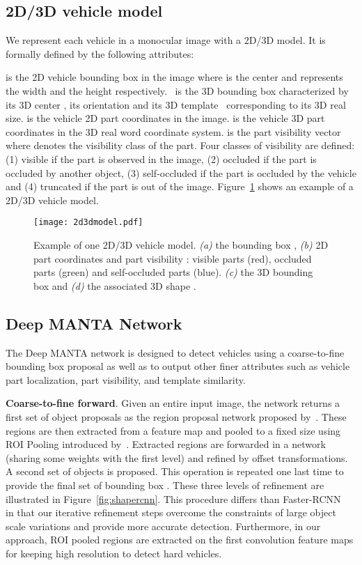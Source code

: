 \documentclass[10pt,twocolumn,letterpaper]{article}
\begin{document}
\subsection{2D/3D vehicle model}
\label{Vehicle shape model}

We represent each vehicle in a monocular image with a 2D/3D model. It is formally defined by the following attributes:

 is the 2D vehicle bounding box in the image where  is the center and  represents the width and the height respectively.~ is the 3D bounding box characterized by its 3D center , its orientation  and its 3D template~ corresponding to its 3D real size.  is the vehicle 2D part coordinates in the image.  is the vehicle 3D part coordinates in the 3D real word coordinate system.  is the part visibility vector where  denotes the visibility class of the  part. Four classes of visibility are defined: (1) visible if the part is observed in the image, (2) occluded if the part is occluded by another object, (3) self-occluded if the part is occluded by the vehicle and (4) truncated if the part is out of the image. Figure~\ref{fig:vis} shows an example of a 2D/3D vehicle model.  

\begin{figure}[ht]
\texttt{[image: 2d3dmodel.pdf]}
\centering
\vspace{-1mm}
\caption{Example of one 2D/3D vehicle model. \textit{(a)} the bounding box , \textit{(b)} 2D part coordinates  and part visibility : visible parts (red), occluded parts (green) and self-occluded parts (blue). \textit{(c)} the 3D bounding box  and \textit{(d)} the associated 3D shape .}
\label{fig:vis}
\end{figure}

\subsection{Deep MANTA Network}
\label{Deep MANTA network}

The Deep MANTA network is designed to detect vehicles using a coarse-to-fine bounding box proposal as well as to output other finer attributes such as vehicle part localization, part visibility, and template similarity.

\textbf{Coarse-to-fine forward}. Given an entire input image, the network returns a first set of  object proposals  as the region proposal network proposed by~\cite{faster}. These regions are then extracted from a feature map and pooled to a fixed size using ROI Pooling introduced by~\cite{fast}. Extracted regions are forwarded in a network (sharing some weights with the first level) and refined by offset transformations. A second set of  objects  is proposed. This operation is repeated one last time to provide the final set of bounding box . These three levels of refinement are illustrated in Figure~\ref{fig:shapercnn}. This procedure differs than Faster-RCNN~\cite{faster} in that our iterative refinement steps overcome the constraints of large object scale variations and provide more accurate detection. Furthermore, in our approach, ROI pooled regions are extracted on the first convolution feature maps for keeping high resolution to detect hard vehicles.
\end{document}
